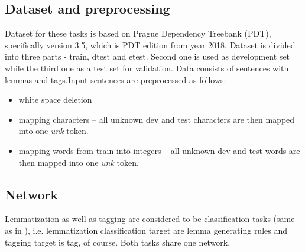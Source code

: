 \subsection{Dataset and preprocessing}
Dataset for these tasks is based on Prague Dependency Treebank (PDT), specifically version 3.5, which is PDT edition from year 2018. Dataset is divided into three parts - train, dtest and etest. Second one is used as development set while the third one as a test set for validation. %
Data consists of sentences with lemmas and tags.Input sentences are preprocessed as follows:
\begin{itemize}
\item white space deletion
\item mapping characters -- all unknown dev and test characters are then mapped into one \textit{unk} token. 
\item mapping  words from train into integers -- all unknown dev and test words are then mapped into one \textit{unk} token. 
\end{itemize}



		
\subsection{Network}
Lemmatization as well as tagging are considered to be classification tasks (same as in \cite[]{straka2019czech}), i.e. lemmatization classification target are lemma generating rules and tagging target is tag, of course. Both tasks share one network.

